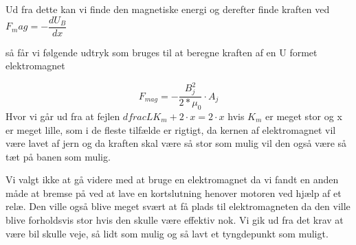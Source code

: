 Ud fra dette kan vi finde den magnetiske energi og derefter finde kraften ved $F_mag = -\dfrac{dU_B}{dx}$

så får vi følgende udtryk som bruges til at beregne kraften af en U formet elektromagnet

\begin{equation}
F_{mag} = - \dfrac{B_j^2}{2*\mu_0} \cdot A_j
\end{equation}
Hvor vi går ud fra at fejlen $dfrac{L}{K_m}+2 \cdot x = 2 \cdot x$ hvis $K_m$ er meget stor og x er meget lille, som i de fleste tilfælde er rigtigt, da kernen af elektromagnet vil være lavet af jern og da kraften skal være så stor som mulig vil den også være så tæt på banen som mulig.

Vi valgt ikke at gå videre med at bruge en elektromagnet da vi fandt en anden måde at bremse på ved at lave en kortslutning henover motoren ved hjælp af et relæ. Den ville også blive meget svært at få plads til elektromagneten da den ville blive forholdsvis stor hvis den skulle være effektiv nok. Vi gik ud fra det krav at være bil skulle veje, så lidt som mulig og så lavt et tyngdepunkt som muligt. 
